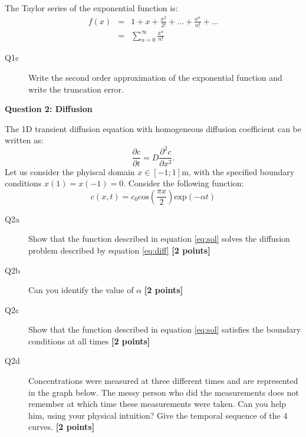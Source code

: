 \documentclass{article}
\begin{document}
The Taylor series of the exponential function is:
\begin{equation}
\begin{array}{lll}
f(x) & = & 1 + x + \frac{x^2}{2!} + ... + \frac{x^n}{n!} + ... \\ 
 & = & \displaystyle{\sum_{n=0}^{\infty}\frac{x^n}{n!}}
 \end{array}
\label{eq:exp}
\end{equation} 

\begin{description}
\item [Q1c] Write the second order approximation of the exponential function and write the truncation error. 
\vspace{3cm}
\end{description}



\textbf{Question 2: Diffusion}

The 1D transient diffusion equation with homogeneous diffusion coefficient can be written as:
\begin{equation}
\frac{\partial c}{\partial t} = D \frac{\partial^2 c}{\partial x^2}. \label{eq:diff}
\end{equation} Let us consider the phyiscal domain $ x \in \left[ -1 ; 1 \right] \mathrm{m}$, with the specified boundary conditions $x(1) = x(-1) = 0$. Consider the following function:
\begin{equation}
c(x,t) = c_0 \mathrm{cos}\left(\frac{\pi x}{2} \right) \mathrm{exp}\left(-\alpha t \right)  \label{eq:sol}
\end{equation}



\begin{description}
\item [Q2a] Show that the function described in equation \ref{eq:sol} solves the diffusion problem described by equation \ref{eq:diff} \textbf{[2 points]}
\vspace{2cm}

\item [Q2b] Can you identify the value of $\alpha$ \textbf{[2 points]}
\vspace{2cm}

\item [Q2c] Show that the function described in equation \ref{eq:sol} satisfies the boundary conditions at all times \textbf{[2 points]}
\vspace{2cm}

\item [Q2d] Concentrations were measured at three different times and are represented in the graph below. The messy person who did the measurements does not remember at which time these measurements were taken. Can you help him, using your physical intuition? Give the temporal sequence of the 4 curves.  \textbf{[2 points]}
\end{description}
\end{document}
